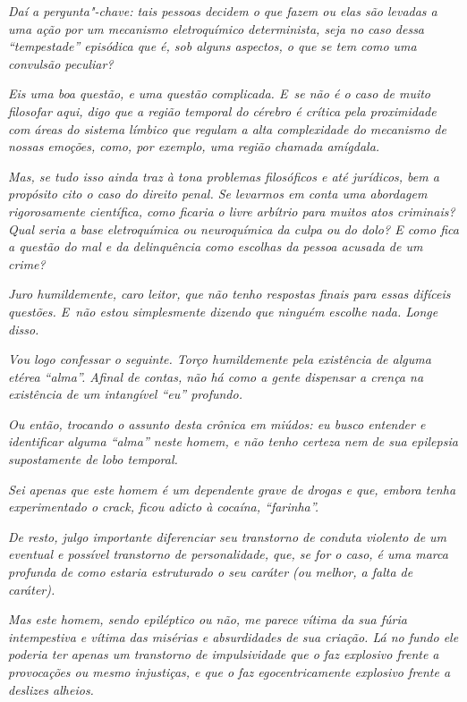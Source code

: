 \emph{Daí a pergunta"-chave: tais pessoas decidem o que fazem ou elas são
levadas a uma ação por um mecanismo eletroquímico determinista, seja no
caso dessa ``tempestade'' episódica que é, sob alguns aspectos, o que se
tem como uma convulsão peculiar?}

\emph{Eis uma boa questão, e uma questão complicada. E~se não é o caso
de muito filosofar aqui, digo que a região temporal do cérebro é crítica
pela proximidade com áreas do sistema límbico que regulam a alta
complexidade do mecanismo de nossas emoções, como, por exemplo, uma
região chamada amígdala.}

\emph{Mas, se tudo isso ainda traz à tona problemas filosóficos e até
jurídicos, bem a propósito cito o caso do direito penal. Se levarmos em
conta uma abordagem rigorosamente científica, como ficaria o livre
arbítrio para muitos atos criminais? Qual seria a base eletroquímica ou
neuroquímica da culpa ou do dolo? E como fica a questão do mal e da
delinquência como escolhas da pessoa acusada de um crime?}

\emph{Juro humildemente, caro leitor, que não tenho respostas finais
para essas difíceis questões. E~não estou simplesmente dizendo que
ninguém escolhe nada. Longe disso.}

\emph{Vou logo confessar o seguinte. Torço humildemente pela existência
de alguma etérea ``alma''. Afinal de contas, não há como a gente
dispensar a crença na existência de um intangível ``eu'' profundo.}

\emph{Ou então, trocando o assunto desta crônica em miúdos: eu busco
entender e identificar alguma ``alma'' neste homem, e não tenho certeza
nem de sua epilepsia supostamente de lobo temporal.}

\emph{Sei apenas que este homem é um dependente grave de drogas e que,
embora tenha experimentado o crack, ficou adicto à cocaína,
``farinha''.}

\emph{De resto, julgo importante diferenciar seu transtorno de conduta
violento de um eventual e possível transtorno de personalidade, que, se
for o caso, é uma marca profunda de como estaria estruturado o seu
caráter (ou melhor, a falta de caráter).}

\emph{Mas este homem, sendo epiléptico ou não, me parece vítima da sua
fúria intempestiva e vítima das misérias e absurdidades de sua criação.
Lá no fundo ele poderia ter apenas um transtorno de impulsividade que o
faz explosivo frente a provocações ou mesmo injustiças, e que o faz
egocentricamente explosivo frente a deslizes alheios.}

